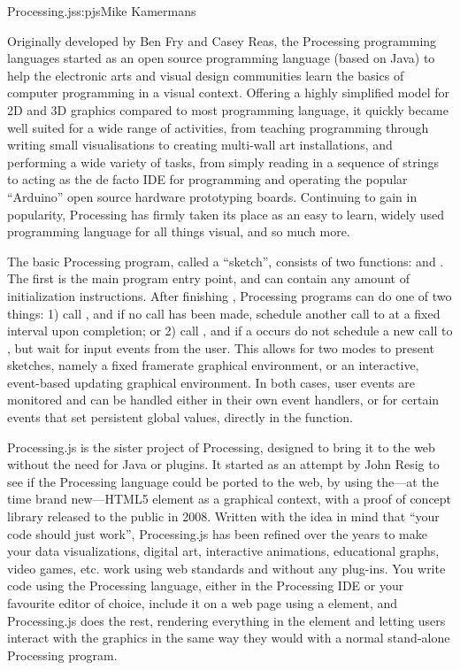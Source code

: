 \begin{aosachapter}{Processing.js}{s:pjs}{Mike Kamermans}

Originally developed by Ben Fry and Casey Reas, the Processing
programming languages started as an open source programming language
(based on Java) to help the electronic arts and visual design
communities learn the basics of computer programming in a visual
context. Offering a highly simplified model for 2D and 3D graphics
compared to most programming language, it quickly became well suited
for a wide range of activities, from teaching programming through
writing small visualisations to creating multi-wall art installations,
and performing a wide variety of tasks, from simply reading in a
sequence of strings to acting as the de facto IDE for programming and
operating the popular ``Arduino'' open source hardware prototyping
boards. Continuing to gain in popularity, Processing has firmly taken
its place as an easy to learn, widely used programming language for
all things visual, and so much more.
  
The basic Processing program, called a ``sketch'', consists of two
functions:  and . The first is the main program
entry point, and can contain any amount of initialization
instructions. After finishing , Processing programs can do
one of two things: 1) call , and if no  call
has been made, schedule another call to  at a fixed
interval upon completion; or 2) call , and if a
 occurs do not schedule a new call to , but
wait for input events from the user. This allows for two modes to
present sketches, namely a fixed framerate graphical environment, or
an interactive, event-based updating graphical environment. In both
cases, user events are monitored and can be handled either in their
own event handlers, or for certain events that set persistent global
values, directly in the  function.

Processing.js is the sister project of Processing, designed to bring
it to the web without the need for Java or plugins. It started as an
attempt by John Resig to see if the Processing language could be
ported to the web, by using the---at the time brand new---HTML5
 element as a graphical context,
with a proof of concept library released to the public in
2008. Written with the idea in mind that ``your code should just
work'', Processing.js has been refined over the years to make your
data visualizations, digital art, interactive animations, educational
graphs, video games, etc. work using web standards and without any
plug-ins. You write code using the Processing language, either in the
Processing IDE or your favourite editor of choice, include it on a web
page using a  element, and
Processing.js does the rest, rendering everything in the
 element and letting users
interact with the graphics in the same way they would with a normal
stand-alone Processing program.


\end{aosachapter}
